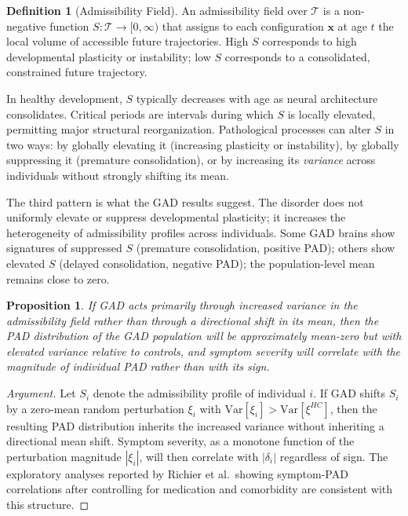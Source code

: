 \documentclass[11pt,a4paper]{article}
\theoremstyle{plain}
\newtheorem{proposition}[theorem]{Proposition}
\theoremstyle{definition}
\newtheorem{definition}[theorem]{Definition}
\begin{document}
\begin{definition}[Admissibility Field]
An admissibility field over $\mathcal{T}$ is a non-negative function
$S: \mathcal{T} \to [0, \infty)$ that assigns to each configuration $\mathbf{x}$ at age
$t$ the local volume of accessible future trajectories. High $S$ corresponds to high
developmental plasticity or instability; low $S$ corresponds to a consolidated, constrained
future trajectory.
\end{definition}

In healthy development, $S$ typically decreases with age as neural architecture
consolidates. Critical periods are intervals during which $S$ is locally elevated,
permitting major structural reorganization. Pathological processes can alter $S$ in two
ways: by globally elevating it (increasing plasticity or instability), by globally
suppressing it (premature consolidation), or by increasing its \emph{variance} across
individuals without strongly shifting its mean.

The third pattern is what the GAD results suggest. The disorder does not uniformly
elevate or suppress developmental plasticity; it increases the heterogeneity of
admissibility profiles across individuals. Some GAD brains show signatures of suppressed
$S$ (premature consolidation, positive PAD); others show elevated $S$ (delayed
consolidation, negative PAD); the population-level mean remains close to zero.

\begin{proposition}
If GAD acts primarily through increased variance in the admissibility field
rather than through a directional shift in its mean, then the PAD distribution of
the GAD population will be approximately mean-zero but with elevated variance relative
to controls, and symptom severity will correlate with the magnitude of individual
PAD rather than with its sign.
\end{proposition}

\begin{proof}[Argument]
Let $S_i$ denote the admissibility profile of individual $i$. If GAD shifts $S_i$
by a zero-mean random perturbation $\xi_i$ with $\mathrm{Var}[\xi_i] > \mathrm{Var}[\xi^{HC}]$,
then the resulting PAD distribution inherits the increased variance without inheriting
a directional mean shift. Symptom severity, as a monotone function of the perturbation
magnitude $|\xi_i|$, will then correlate with $|\delta_i|$ regardless of sign.
The exploratory analyses reported by Richier et al.\ showing symptom-PAD correlations
after controlling for medication and comorbidity are consistent with this structure.
\end{proof}
\end{document}
